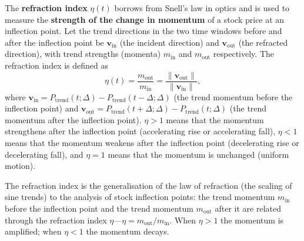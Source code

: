 \begin{definition}\label{def:refraction_index_stock}
The \textbf{refraction index} $\eta(t)$ borrows from Snell's law in optics and is used to measure the \textbf{strength of the change in momentum} of a stock price at an inflection point. Let the trend directions in the two time windows before and after the inflection point be $\mathbf{v}_{\text{in}}$ (the incident direction) and $\mathbf{v}_{\text{out}}$ (the refracted direction), with trend strengths (momenta) $m_{\text{in}}$ and $m_{\text{out}}$ respectively. The refraction index is defined as
\[
\eta(t) = \frac{m_{\text{out}}}{m_{\text{in}}} = \frac{\|\mathbf{v}_{\text{out}}\|}{\|\mathbf{v}_{\text{in}}\|},
\]
where $\mathbf{v}_{\text{in}} = P_{\text{trend}}(t; \Delta) - P_{\text{trend}}(t-\Delta; \Delta)$ (the trend momentum before the inflection point) and $\mathbf{v}_{\text{out}} = P_{\text{trend}}(t+\Delta; \Delta) - P_{\text{trend}}(t; \Delta)$ (the trend momentum after the inflection point). $\eta > 1$ means that the momentum strengthens after the inflection point (accelerating rise or accelerating fall), $\eta < 1$ means that the momentum weakens after the inflection point (decelerating rise or decelerating fall), and $\eta = 1$ means that the momentum is unchanged (uniform motion).

The refraction index is the generalisation of the law of refraction (the scaling of sine trends) to the analysis of stock inflection points: the trend momentum $m_{\text{in}}$ before the inflection point and the trend momentum $m_{\text{out}}$ after it are related through the refraction index $\eta$---$\eta = m_{\text{out}}/m_{\text{in}}$. When $\eta > 1$ the momentum is amplified; when $\eta < 1$ the momentum decays.
\end{definition}

